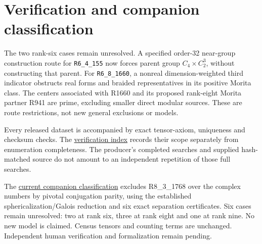 \documentclass[11pt,a4paper]{article}
\theoremstyle{definition}\newtheorem{definition}[theorem]{Definition}\newtheorem{remark}[theorem]{Remark}
\begin{document}
\section{Verification and companion classification}

The two rank-six cases remain unresolved. A specified order-32 near-group
construction route for \texttt{R6\_4\_155} now forces parent group
$C_4\times C_2^3$, without constructing that parent. For
\texttt{R6\_8\_1660}, a nonreal dimension-weighted third indicator
obstructs real forms and braided representatives in its positive Morita
class. The centers associated with R1660 and its proposed rank-eight
Morita partner R941 are prime, excluding smaller direct modular sources.
These are route restrictions, not new general exclusions or models.



Every released dataset is accompanied by exact tensor-axiom, uniqueness and
checksum checks. The \href{https://github.com/sebastienpalcoux/fusion-ring-census/blob/main/verification/README.md}{verification index}
records their scope separately from enumeration completeness. The producer's
completed searches and supplied hash-matched source do not amount to an
independent repetition of those full searches.

The \href{https://github.com/sebastienpalcoux/grothendieck-ring-classification/blob/main/evidence/frontier/README.md}{current companion classification}
excludes R8\_3\_1768 over the complex numbers by pivotal conjugation parity,
using the established sphericalization/Galois reduction and six exact
separation certificates. Six cases remain unresolved: two at rank six, three at rank eight and one at rank nine. No new model is claimed. Census
tensors and counting terms are unchanged. Independent human verification
and formalization remain pending.
\end{document}
